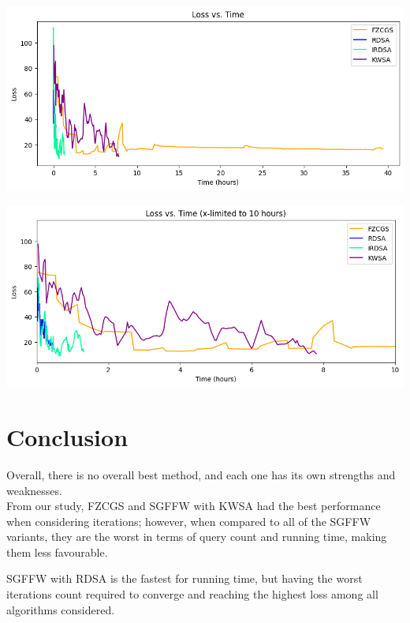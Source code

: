 \documentclass[10pt,twocolumn,letterpaper]{article}
\begin{document}
\begin{center}
   \includegraphics*[scale=0.35]{img/All_loss_vs_runningtime.png}
\end{center}
\begin{center}
   \includegraphics*[scale=0.35]{img/xLimit_All_loss_vs_runningtime.png}\\
\end{center}



\section{Conclusion}

Overall, there is no overall best method, and each one has its own strengths and weaknesses. \\

From our study, FZCGS and SGFFW with KWSA had the best performance when considering iterations;
however, when compared to all of the SGFFW variants, they are the worst in terms
of query count and running time, making them less favourable.

SGFFW with RDSA is the fastest for running time, but having the
worst iterations count required to converge and reaching the highest loss among all algorithms considered. \\
\end{document}
